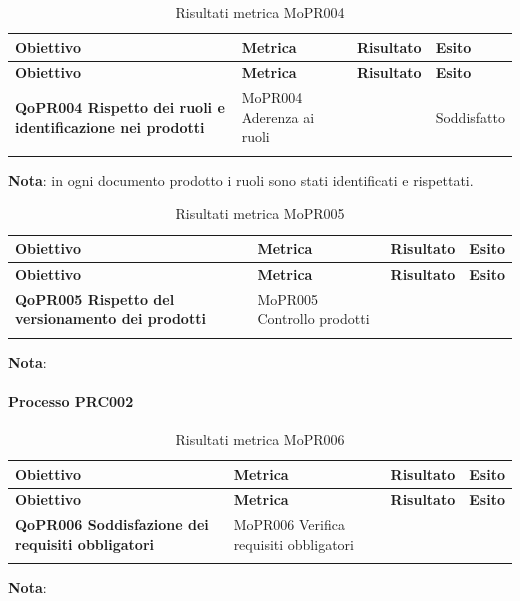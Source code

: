 \documentclass[../piano-di-qualifica.tex]{subfiles}
\begin{document}
\renewcommand{\arraystretch}{2} %
\begin{longtable}[H]{>{\centering\bfseries}m{5cm} >{\centering}m{5cm} >{\centering}m{2.5cm} >{\centering\arraybackslash}m{2.5cm}}  
  \rowcolor{lightgray}
  {\textbf{Obiettivo}} & {\textbf{Metrica}} & {\textbf{Risultato}} & {\textbf{Esito}}  \\
  \endfirsthead%
  \rowcolor{lightgray}
  {\textbf{Obiettivo}} & {\textbf{Metrica}} & {\textbf{Risultato}} & {\textbf{Esito}}  \\
  \endhead%
  \textbf{QoPR004 Rispetto dei ruoli e identificazione nei prodotti} & MoPR004 Aderenza ai ruoli & 0 & Soddisfatto \\
  \caption{Risultati metrica MoPR004}
  \label{tab:my-table}
\end{longtable}
\textbf{Nota}: in ogni documento prodotto i ruoli sono stati identificati e rispettati.

\renewcommand{\arraystretch}{2} %
\begin{longtable}[H]{>{\centering\bfseries}m{5cm} >{\centering}m{5cm} >{\centering}m{2.5cm} >{\centering\arraybackslash}m{2.5cm}}  
  \rowcolor{lightgray}
  {\textbf{Obiettivo}} & {\textbf{Metrica}} & {\textbf{Risultato}} & {\textbf{Esito}}  \\
  \endfirsthead%
  \rowcolor{lightgray}
  {\textbf{Obiettivo}} & {\textbf{Metrica}} & {\textbf{Risultato}} & {\textbf{Esito}}  \\
  \endhead%
  \textbf{QoPR005 Rispetto del versionamento dei prodotti} & MoPR005 Controllo prodotti &  &  \\
  \caption{Risultati metrica MoPR005}
  \label{tab:my-table}
\end{longtable}
\textbf{Nota}: 

\paragraph{Processo PRC002}
\label{sub:processo_PRC002}

\renewcommand{\arraystretch}{2} %
\begin{longtable}[H]{>{\centering\bfseries}m{5cm} >{\centering}m{5cm} >{\centering}m{2.5cm} >{\centering\arraybackslash}m{2.5cm}}  
  \rowcolor{lightgray}
  {\textbf{Obiettivo}} & {\textbf{Metrica}} & {\textbf{Risultato}} & {\textbf{Esito}}  \\
  \endfirsthead%
  \rowcolor{lightgray}
  {\textbf{Obiettivo}} & {\textbf{Metrica}} & {\textbf{Risultato}} & {\textbf{Esito}}  \\
  \endhead%
  \textbf{QoPR006 Soddisfazione dei requisiti obbligatori} & MoPR006 Verifica requisiti obbligatori &  &  \\
  \caption{Risultati metrica MoPR006}
  \label{tab:my-table}
\end{longtable}
\textbf{Nota}: 
\end{document}
